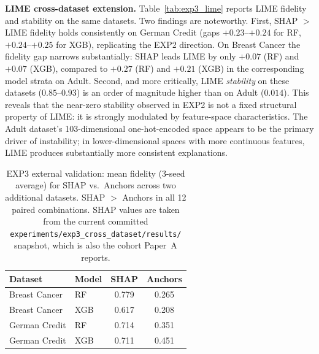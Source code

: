 \documentclass[twoside,11pt]{article}
\begin{document}
\textbf{LIME cross-dataset extension.}
Table~\ref{tab:exp3_lime} reports LIME fidelity and stability on the same
datasets. Two findings are noteworthy. First, SHAP $>$ LIME fidelity holds
consistently on German Credit (gaps $+0.23$--$+0.24$ for RF, $+0.24$--$+0.25$
for XGB), replicating the EXP2 direction. On Breast Cancer the fidelity gap
narrows substantially: SHAP leads LIME by only $+0.07$ (RF) and $+0.07$
(XGB), compared to $+0.27$ (RF) and $+0.21$ (XGB) in the corresponding
model strata on Adult. Second, and more critically, LIME
\emph{stability} on these datasets ($0.85$--$0.93$) is an order of magnitude
higher than on Adult ($0.014$). This reveals that the near-zero stability
observed in EXP2 is not a fixed structural property of LIME: it is strongly
modulated by feature-space characteristics. The Adult dataset's 103-dimensional
one-hot-encoded space appears to be the primary driver of instability; in
lower-dimensional spaces with more continuous features, LIME produces
substantially more consistent explanations.

\begin{table}[t]
\centering
\caption{EXP3 external validation: mean fidelity (3-seed average) for
SHAP vs.\ Anchors across two additional datasets. SHAP $>$ Anchors in all
12 paired combinations. SHAP values are taken from the current committed
\texttt{experiments/exp3\_cross\_dataset/results/} snapshot, which is also the
cohort Paper~A reports.}
\label{tab:exp3_fidelity}
\begin{tabular}{llcc}
\toprule
Dataset        & Model & SHAP  & Anchors \\
\midrule
Breast Cancer  & RF    & 0.779 & 0.265   \\
Breast Cancer  & XGB   & 0.617 & 0.208   \\
German Credit  & RF    & 0.714 & 0.351   \\
German Credit  & XGB   & 0.711 & 0.451   \\
\bottomrule
\end{tabular}
\end{table}
\end{document}
